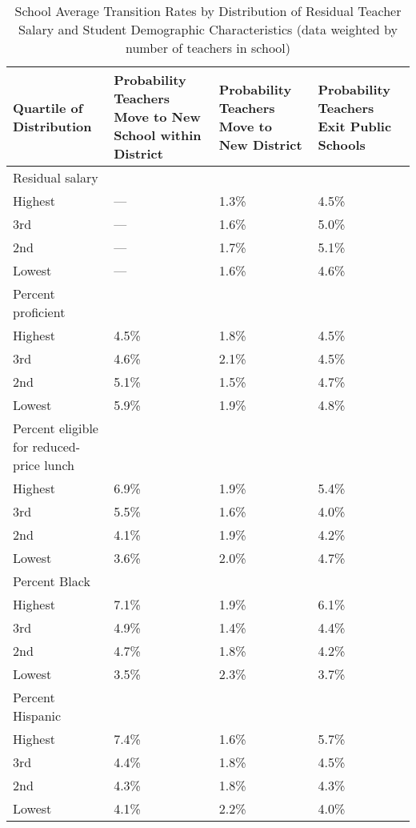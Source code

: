 \documentclass[12pt,]{article}
\begin{document}
\begin{table}[htbp]
\centering
\begin{tabular}{p{}p{}p{}p{}}
  \hline
Quartile of Distribution & Probability Teachers Move to New School within District & Probability Teachers Move to New District & Probability Teachers Exit Public Schools \\ 
  \hline
Residual salary & & & \\
\quad Highest & --- & 1.3\% & 4.5\% \\ 
  \quad 3rd & --- & 1.6\% & 5.0\% \\ 
  \quad 2nd & --- & 1.7\% & 5.1\% \\ 
  \quad Lowest & --- & 1.6\% & 4.6\% \\ 
Percent proficient & & & \\
  \quad Highest & 4.5\% & 1.8\% & 4.5\% \\ 
  \quad 3rd & 4.6\% & 2.1\% & 4.5\% \\ 
  \quad 2nd & 5.1\% & 1.5\% & 4.7\% \\ 
  \quad Lowest & 5.9\% & 1.9\% & 4.8\% \\ 
Percent eligible for reduced-price lunch & & & \\
  \quad Highest & 6.9\% & 1.9\% & 5.4\% \\ 
  \quad 3rd & 5.5\% & 1.6\% & 4.0\% \\ 
  \quad 2nd & 4.1\% & 1.9\% & 4.2\% \\ 
  \quad Lowest & 3.6\% & 2.0\% & 4.7\% \\ 
Percent Black & & & \\
  \quad Highest & 7.1\% & 1.9\% & 6.1\% \\ 
  \quad 3rd & 4.9\% & 1.4\% & 4.4\% \\ 
  \quad 2nd & 4.7\% & 1.8\% & 4.2\% \\ 
  \quad Lowest & 3.5\% & 2.3\% & 3.7\% \\ 
Percent Hispanic & & & \\
  \quad Highest & 7.4\% & 1.6\% & 5.7\% \\ 
  \quad 3rd & 4.4\% & 1.8\% & 4.5\% \\ 
  \quad 2nd & 4.3\% & 1.8\% & 4.3\% \\ 
  \quad Lowest & 4.1\% & 2.2\% & 4.0\% \\ 
   \hline
\end{tabular}
\caption{School Average Transition Rates by Distribution of Residual Teacher Salary and Student Demographic Characteristics (data weighted by number of teachers in school)} 
\label{tbl:change_by_quartile}
\end{table}
\end{document}
